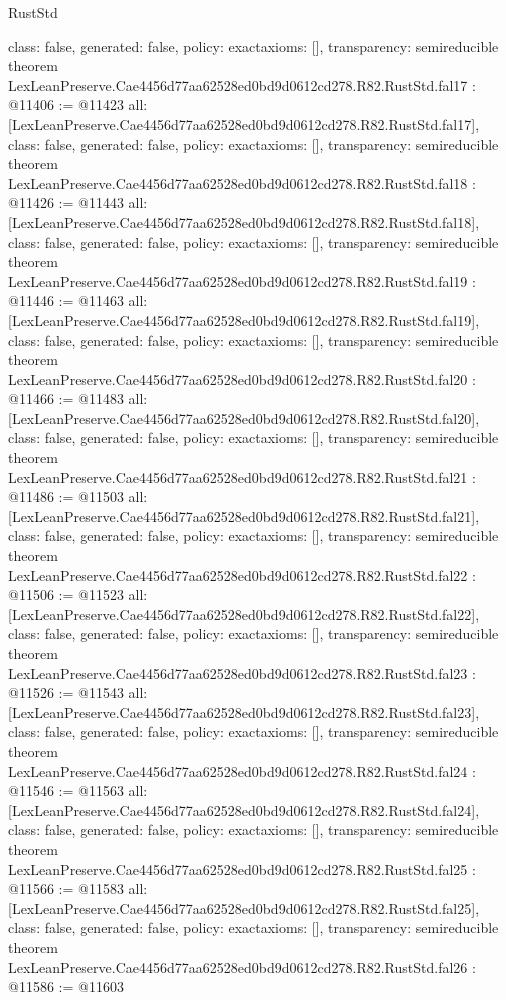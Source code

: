\begin{lexlean}{RustStd}
\begin{coremodule}
{  class: false,
  generated: false,
  policy: exact{axioms: []},
  transparency: semireducible
}
theorem LexLeanPreserve.Cae4456d77aa62528ed0bd9d0612cd278.R82.RustStd.fal17 : @11406 := @11423 {
  all: [LexLeanPreserve.Cae4456d77aa62528ed0bd9d0612cd278.R82.RustStd.fal17],
  class: false,
  generated: false,
  policy: exact{axioms: []},
  transparency: semireducible
}
theorem LexLeanPreserve.Cae4456d77aa62528ed0bd9d0612cd278.R82.RustStd.fal18 : @11426 := @11443 {
  all: [LexLeanPreserve.Cae4456d77aa62528ed0bd9d0612cd278.R82.RustStd.fal18],
  class: false,
  generated: false,
  policy: exact{axioms: []},
  transparency: semireducible
}
theorem LexLeanPreserve.Cae4456d77aa62528ed0bd9d0612cd278.R82.RustStd.fal19 : @11446 := @11463 {
  all: [LexLeanPreserve.Cae4456d77aa62528ed0bd9d0612cd278.R82.RustStd.fal19],
  class: false,
  generated: false,
  policy: exact{axioms: []},
  transparency: semireducible
}
theorem LexLeanPreserve.Cae4456d77aa62528ed0bd9d0612cd278.R82.RustStd.fal20 : @11466 := @11483 {
  all: [LexLeanPreserve.Cae4456d77aa62528ed0bd9d0612cd278.R82.RustStd.fal20],
  class: false,
  generated: false,
  policy: exact{axioms: []},
  transparency: semireducible
}
theorem LexLeanPreserve.Cae4456d77aa62528ed0bd9d0612cd278.R82.RustStd.fal21 : @11486 := @11503 {
  all: [LexLeanPreserve.Cae4456d77aa62528ed0bd9d0612cd278.R82.RustStd.fal21],
  class: false,
  generated: false,
  policy: exact{axioms: []},
  transparency: semireducible
}
theorem LexLeanPreserve.Cae4456d77aa62528ed0bd9d0612cd278.R82.RustStd.fal22 : @11506 := @11523 {
  all: [LexLeanPreserve.Cae4456d77aa62528ed0bd9d0612cd278.R82.RustStd.fal22],
  class: false,
  generated: false,
  policy: exact{axioms: []},
  transparency: semireducible
}
theorem LexLeanPreserve.Cae4456d77aa62528ed0bd9d0612cd278.R82.RustStd.fal23 : @11526 := @11543 {
  all: [LexLeanPreserve.Cae4456d77aa62528ed0bd9d0612cd278.R82.RustStd.fal23],
  class: false,
  generated: false,
  policy: exact{axioms: []},
  transparency: semireducible
}
theorem LexLeanPreserve.Cae4456d77aa62528ed0bd9d0612cd278.R82.RustStd.fal24 : @11546 := @11563 {
  all: [LexLeanPreserve.Cae4456d77aa62528ed0bd9d0612cd278.R82.RustStd.fal24],
  class: false,
  generated: false,
  policy: exact{axioms: []},
  transparency: semireducible
}
theorem LexLeanPreserve.Cae4456d77aa62528ed0bd9d0612cd278.R82.RustStd.fal25 : @11566 := @11583 {
  all: [LexLeanPreserve.Cae4456d77aa62528ed0bd9d0612cd278.R82.RustStd.fal25],
  class: false,
  generated: false,
  policy: exact{axioms: []},
  transparency: semireducible
}
theorem LexLeanPreserve.Cae4456d77aa62528ed0bd9d0612cd278.R82.RustStd.fal26 : @11586 := @11603 {
}
\end{coremodule}
\end{lexlean}
